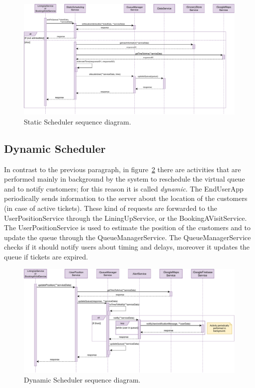 \begin{figure}[H]
	\centering
	\includegraphics[width=1.0\textwidth]{images/scheduler_sequence_diagram.pdf}
	\caption{Static Scheduler sequence diagram.}\label{fig:StaticScheduler}
\end{figure}

\subsection{Dynamic Scheduler}

In contrast to the previous paragraph, in figure~\ref{fig:DynamicScheduler} there are activities that are performed mainly in background by the system to reschedule the virtual queue and to notify customers; for this reason it is called \textit{dynamic}.
The EndUserApp periodically sends information to the server about the location of the customers (in case of active tickets). These kind of requests are forwarded to the UserPositionService through the LiningUpService, or the BookingAVisitService. The UserPositionService is used to estimate the position of the customers and to update the queue through the QueueManagerService.
The QueueManagerService checks if it should notify users about timing and delays, moreover it updates the queue if tickets are expired.

\begin{figure}[H]
	\centering
	\includegraphics[width=1.0\textwidth]{images/dynamicScheduler_sequence_diagram.pdf}
	\caption{Dynamic Scheduler sequence diagram.}\label{fig:DynamicScheduler}
\end{figure}

